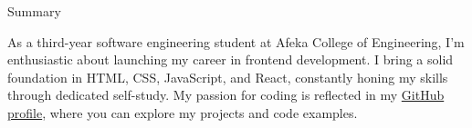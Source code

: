 \documentclass{resume}
\begin{document}

 \begin{rSection}{Summary}

  As a third-year software engineering student at Afeka College of Engineering, I'm enthusiastic about launching my
  career in frontend development. I bring a solid foundation in HTML, CSS, JavaScript, and React,
  constantly honing my skills through dedicated self-study.
  My passion for coding is reflected in my \href{https://github.com/Asnvir}{GitHub profile}, where you can explore my projects and
  code examples.


 \end{rSection}














\end{document}
